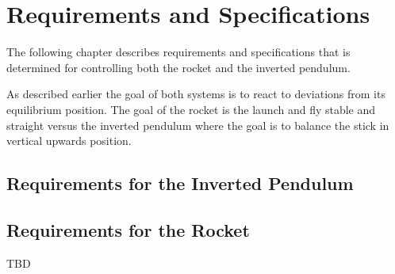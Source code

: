 \chapter{Requirements and Specifications}
The following chapter describes requirements and specifications that is determined for controlling both the rocket and the inverted pendulum.

As described earlier the goal of both systems is to react to deviations from its equilibrium position. The goal of the rocket is the launch and fly stable and straight versus the inverted pendulum where the goal is to balance the stick in vertical upwards position.  



\section{Requirements for the Inverted Pendulum}




\section{Requirements for the Rocket}
TBD